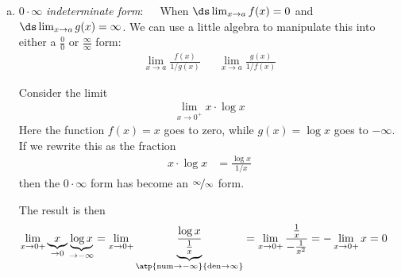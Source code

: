 \begin{enumerate}[(a)]
\item $0\cdot\infty$ \emph{indeterminate form}:\ \ \ When $\ds \lim_{x\to a}f(x) = 0$ and
$\ds \lim_{x\to a} g(x) = \infty$. We can use a little algebra to manipulate this into
either a $\frac{0}{0}$ or $\frac{\infty}{\infty}$ form:
\begin{align*}
  \lim_{x \to a} \frac{f(x)}{1/g(x)} &&
  \lim_{x \to a} \frac{g(x)}{1/f(x)}
\end{align*}
\begin{eg}\label{eg:hopitalJ}
Consider the limit
\begin{align*}
  \lim_{x\to 0^+} x \cdot \log x
\end{align*}
Here the function $f(x)=x$ goes to zero, while $g(x)=\log x$ goes to $-\infty$. If we
rewrite this as the fraction
\begin{align*}
  x \cdot \log x &= \frac{\log x}{1/x}
\end{align*}
then the $0 \cdot \infty$ form has become an $\nicefrac\infty\infty$ form.

The result is then
\begin{align*}
\lim_{x\rightarrow 0+}\underbrace{x}_{\rightarrow 0}
                      \underbrace{\log x}_{\rightarrow-\infty}
& =\lim_{x\rightarrow 0+}\underbrace{\frac{\log x}
     {\frac{1}{x}}}_{\atp
        {\mathrm{num}\rightarrow-\infty}
        {\mathrm{den}\rightarrow\infty}}
=\lim_{x\rightarrow 0+}\frac{\frac{1}{x}}{-\frac{1}{x^2}}
=-\lim_{x\rightarrow 0+}x
=0
\end{align*}
\end{eg}



\end{enumerate}

